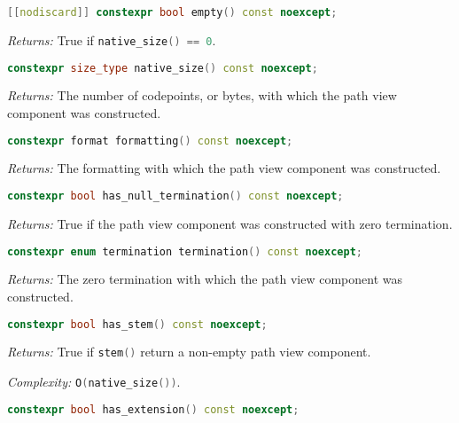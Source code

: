 \documentclass[11pt]{article}
\newcommand{\code}[2][cpp]{\lstinline[language=#1,basicstyle=\small\ttfamily]{#2}}
\newcommand{\desc}[1]{\textit{#1}}
\newcommand{\returns}{\desc{Returns: }}
\newcommand{\complexity}{\desc{Complexity: }}
\begin{document}
\begin{lstlisting}[language=cpp]
    [[nodiscard]] constexpr bool empty() const noexcept;
\end{lstlisting}

\returns True if \code{native_size() == 0}.\\

\begin{lstlisting}[language=cpp]
    constexpr size_type native_size() const noexcept;
\end{lstlisting}

\returns The number of codepoints, or bytes, with which the path view component was constructed.\\

\begin{lstlisting}[language=cpp]
    constexpr format formatting() const noexcept;
\end{lstlisting}

\returns The formatting with which the path view component was constructed.\\

\begin{lstlisting}[language=cpp]
    constexpr bool has_null_termination() const noexcept;
\end{lstlisting}

\returns True if the path view component was constructed with zero termination.\\

\begin{lstlisting}[language=cpp]
    constexpr enum termination termination() const noexcept;
\end{lstlisting}

\returns The zero termination with which the path view component was constructed.\\

\begin{lstlisting}[language=cpp]
    constexpr bool has_stem() const noexcept;
\end{lstlisting}

\returns True if \code{stem()} return a non-empty path view component.

\complexity \code{O(native_size())}.\\

\begin{lstlisting}[language=cpp]
    constexpr bool has_extension() const noexcept;
\end{lstlisting}
\end{document}
